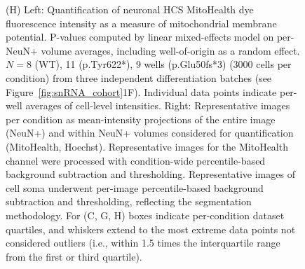 \begin{figure}[ht]
{        (H) Left: Quantification of neuronal HCS MitoHealth dye fluorescence intensity as a measure of mitochondrial membrane potential. P-values computed by linear mixed-effects model on per-NeuN+ volume averages, including well-of-origin as a random effect. $N=8$ (WT), 11 (p.Tyr622*), 9 wells (p.Glu50fs*3) (3000 cells per condition) from three independent differentiation batches (see Figure~\ref{fig:snRNA_cohort}1F). Individual data points indicate per-well averages of cell-level intensities. Right: Representative images per condition as mean-intensity projections of the entire image (NeuN+) and within NeuN+ volumes considered for quantification (MitoHealth, Hoechst). Representative images for the MitoHealth channel were processed with condition-wide percentile-based background subtraction and thresholding. Representative images of cell soma underwent per-image percentile-based background subtraction and thresholding, reflecting the segmentation methodology. For (C, G, H) boxes indicate per-condition dataset quartiles, and whiskers extend to the most extreme data points not considered outliers (i.e., within 1.5 times the interquartile range from the first or third quartile). 
    }
    \label{fig:main_mitochondrial}
\end{figure}
